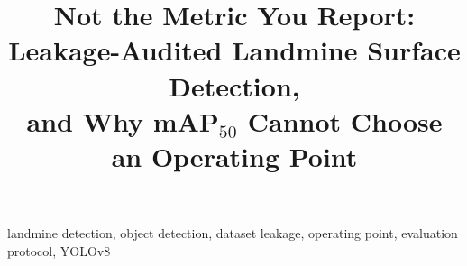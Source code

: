 \documentclass[conference]{IEEEtran}
\title{Not the Metric You Report:\\
Leakage-Audited Landmine Surface Detection,\\
and Why mAP$_{50}$ Cannot Choose an Operating Point}
\author{\IEEEauthorblockN{Anonymous Authors}%
\IEEEauthorblockA{Preprint. Under review.}}
\begin{document}
\maketitle



\begin{IEEEkeywords}
landmine detection, object detection, dataset leakage, operating point,
evaluation protocol, YOLOv8
\end{IEEEkeywords}

















\appendices

\end{document}
